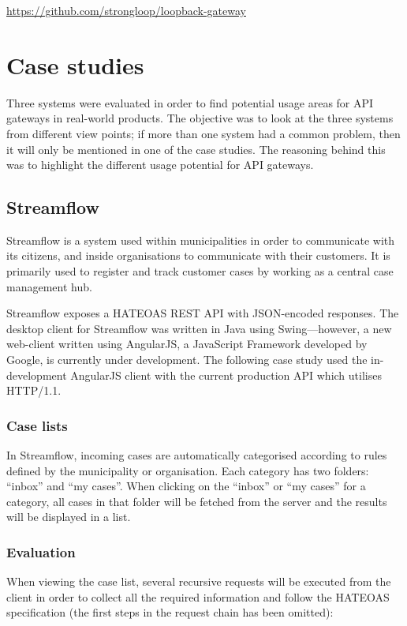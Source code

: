 \documentclass{cslthse-msc}
\begin{document}
\vspace{5mm}

\noindent \url{https://github.com/strongloop/loopback-gateway}

\chapter{Case studies}

Three systems were evaluated in order to find potential usage areas for API gateways in real-world products. The objective was to look at the three systems from different view points; if more than one system had a common problem, then it will only be mentioned in one of the case studies. The reasoning behind this was to highlight the different usage potential for API gateways.

\section{Streamflow}
Streamflow \cite{streamflow} is a system used within municipalities in order to communicate with its citizens, and inside organisations to communicate with their customers. It is primarily used to register and track customer cases by working as a central case management hub.

Streamflow exposes a HATEOAS REST API with JSON-encoded responses. The desktop client for Streamflow was written in Java using Swing---however, a new web-client written using AngularJS, a JavaScript Framework developed by Google, is currently under development. The following case study used the in-development AngularJS client with the current production API which utilises HTTP/1.1.

\subsection{Case lists}
In Streamflow, incoming cases are automatically categorised according to rules defined by the municipality or organisation. Each category has two folders: \enquote{inbox} and \enquote{my cases}. When clicking on the \enquote{inbox} or \enquote{my cases} for a category, all cases in that folder will be fetched from the server and the results will be displayed in a list.

\subsection{Evaluation}
When viewing the case list, several recursive requests will be executed from the client in order to collect all the required information and follow the HATEOAS specification (the first steps in the request chain has been omitted):
\end{document}
